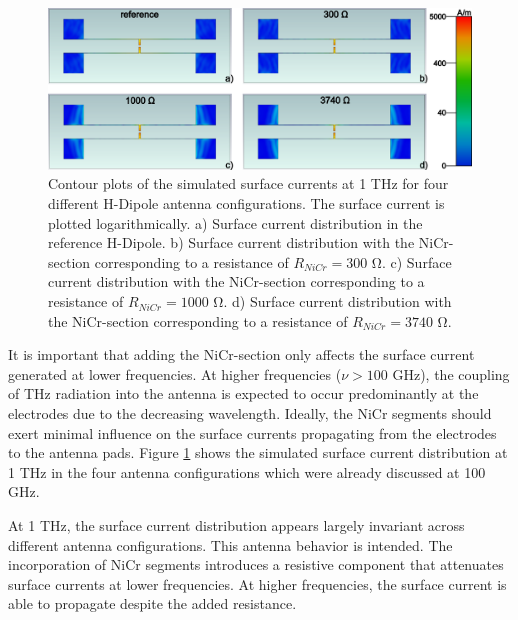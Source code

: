 \begin{figure}[ht]
    \centering
    \includegraphics[width=\linewidth]{figures/Contour_Plots_v2/1Thz_SC_sim_plots.png}
    \caption{Contour plots of the simulated surface currents at \num{1} \si{\tera \hertz} for four different H-Dipole antenna configurations. The surface current is plotted logarithmically. a) Surface current distribution in the reference H-Dipole. b) Surface current distribution with the NiCr-section corresponding to a resistance of $R_{NiCr} = 300$ \si{\ohm}. c) Surface current distribution with the NiCr-section corresponding to a resistance of $R_{NiCr} = 1000$ \si{\ohm}. d) Surface current distribution with the NiCr-section corresponding to a resistance of $R_{NiCr} = 3740$ \si{\ohm}.}
    \label{sc_1thz_comp}
\end{figure}

It is important that adding the NiCr-section only affects the surface current generated at lower frequencies. At higher frequencies ($\nu > 100$ \si{\giga \hertz}), the coupling of THz radiation into the antenna is expected to occur predominantly at the electrodes due to the decreasing wavelength. Ideally, the NiCr segments should exert minimal influence on the surface currents propagating from the electrodes to the antenna pads. Figure \ref{sc_1thz_comp} shows the simulated surface current distribution at \num{1} \si{\tera \hertz} in the four antenna configurations which were already discussed at \num{100} \si{\giga \hertz}. 

At \num{1} \si{\tera \hertz}, the surface current distribution appears largely invariant across different antenna configurations. This antenna behavior is intended. The incorporation of NiCr segments introduces a resistive component that attenuates surface currents at lower frequencies. At higher frequencies, the surface current is able to propagate despite the added resistance. 



